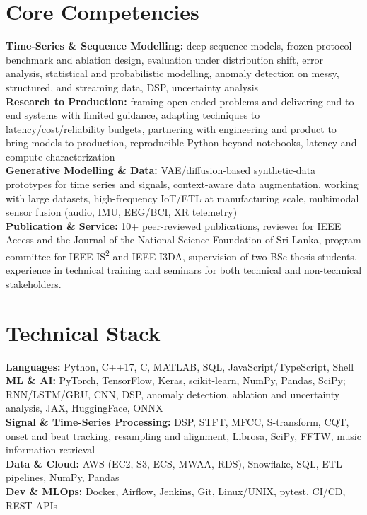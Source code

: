 \documentclass[11pt]{article}
\begin{document}


\section*{Core Competencies}

\textbf{Time-Series \& Sequence Modelling:} deep sequence models, frozen-protocol benchmark and ablation design, evaluation under distribution shift, error analysis, statistical and probabilistic modelling, anomaly detection on messy, structured, and streaming data, DSP, uncertainty analysis\\
\textbf{Research to Production:} framing open-ended problems and delivering end-to-end systems with limited guidance, adapting techniques to latency/cost/reliability budgets, partnering with engineering and product to bring models to production, reproducible Python beyond notebooks, latency and compute characterization\\
\textbf{Generative Modelling \& Data:} VAE/diffusion-based synthetic-data prototypes for time series and signals, context-aware data augmentation, working with large datasets, high-frequency IoT/ETL at manufacturing scale, multimodal sensor fusion (audio, IMU, EEG/BCI, XR telemetry)\\
\textbf{Publication \& Service:} 10+ peer-reviewed publications, reviewer for IEEE Access and the Journal of the National Science Foundation of Sri Lanka, program committee for IEEE IS\textsuperscript{2} and IEEE I3DA, supervision of two BSc thesis students, experience in technical training and seminars for both technical and non-technical stakeholders. 

\section*{Technical Stack}

\textbf{Languages:} Python, C++17, C, MATLAB, SQL, JavaScript/TypeScript, Shell\\
\textbf{ML \& AI:} PyTorch, TensorFlow, Keras, scikit-learn, NumPy, Pandas, SciPy; RNN/LSTM/GRU, CNN, DSP, anomaly detection, ablation and uncertainty analysis, JAX, HuggingFace, ONNX\\
\textbf{Signal \& Time-Series Processing:} DSP, STFT, MFCC, S-transform, CQT, onset and beat tracking, resampling and alignment, Librosa, SciPy, FFTW, music information retrieval\\
\textbf{Data \& Cloud:} AWS (EC2, S3, ECS, MWAA, RDS), Snowflake, SQL, ETL pipelines, NumPy, Pandas\\
\textbf{Dev \& MLOps:} Docker, Airflow, Jenkins, Git, Linux/UNIX, pytest, CI/CD, REST APIs
\end{document}
